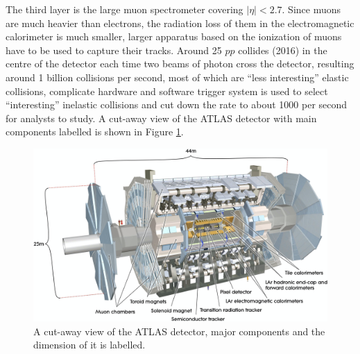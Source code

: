 \documentclass[12pt]{article}
\begin{document}
        The third layer is the large muon spectrometer covering $|\eta| < 2.7$. Since muons are much heavier than electrons, the radiation loss of them in the 
        electromagnetic calorimeter is much smaller, larger apparatus based on the ionization of muons have to be used to capture their tracks. 
        Around 25 $pp$ collides (2016) in the centre of the detector each time two beams of photon cross the detector, 
        resulting around 1 billion collisions per second, most of which are ``less interesting'' elastic collisions, 
        complicate hardware and software trigger system\cite{Nedden_2017} is used to select ``interesting'' inelastic collisions and cut down the
        rate to about 1000 per second for analysts to study. 
        A cut-away view of the ATLAS detector with main components labelled is shown in Figure \ref{fig:atlasdet}\cite{Collaboration_2008}.

        \begin{figure}[ht]
            \begin{centering}
            \includegraphics[scale=0.35]{ps/atlas_det.png}
            \caption{A cut-away view of the ATLAS detector, major components and the dimension of it is labelled.}
            \label{fig:atlasdet}
            \end{centering}

        \end{figure}
\end{document}
